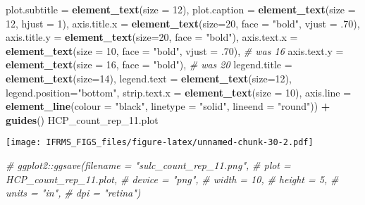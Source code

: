 \documentclass[
]{article}
\newenvironment{Shaded}{\begin{snugshade}}{\end{snugshade}}
\newcommand{\CommentTok}[1]{\textcolor[rgb]{0.56,0.35,0.01}{\textit{#1}}}
\newcommand{\DataTypeTok}[1]{\textcolor[rgb]{0.13,0.29,0.53}{#1}}
\newcommand{\DecValTok}[1]{\textcolor[rgb]{0.00,0.00,0.81}{#1}}
\newcommand{\FloatTok}[1]{\textcolor[rgb]{0.00,0.00,0.81}{#1}}
\newcommand{\KeywordTok}[1]{\textcolor[rgb]{0.13,0.29,0.53}{\textbf{#1}}}
\newcommand{\NormalTok}[1]{#1}
\newcommand{\OperatorTok}[1]{\textcolor[rgb]{0.81,0.36,0.00}{\textbf{#1}}}
\newcommand{\StringTok}[1]{\textcolor[rgb]{0.31,0.60,0.02}{#1}}
\begin{document}
\begin{Shaded}
\begin{Highlighting}[]
        \DataTypeTok{plot.subtitle =} \KeywordTok{element_text}\NormalTok{(}\DataTypeTok{size =} \DecValTok{12}\NormalTok{),}
        \DataTypeTok{plot.caption =} \KeywordTok{element_text}\NormalTok{(}\DataTypeTok{size =} \DecValTok{12}\NormalTok{, }\DataTypeTok{hjust =} \DecValTok{1}\NormalTok{),}
        \DataTypeTok{axis.title.x =} \KeywordTok{element_text}\NormalTok{(}\DataTypeTok{size=}\DecValTok{20}\NormalTok{, }\DataTypeTok{face =} \StringTok{"bold"}\NormalTok{, }\DataTypeTok{vjust =} \FloatTok{.70}\NormalTok{),}
        \DataTypeTok{axis.title.y =} \KeywordTok{element_text}\NormalTok{(}\DataTypeTok{size=}\DecValTok{20}\NormalTok{, }\DataTypeTok{face =} \StringTok{"bold"}\NormalTok{),}
        \DataTypeTok{axis.text.x =} \KeywordTok{element_text}\NormalTok{(}\DataTypeTok{size =} \DecValTok{10}\NormalTok{, }\DataTypeTok{face =} \StringTok{"bold"}\NormalTok{, }\DataTypeTok{vjust =} \FloatTok{.70}\NormalTok{), }\CommentTok{# was 16}
        \DataTypeTok{axis.text.y =} \KeywordTok{element_text}\NormalTok{(}\DataTypeTok{size =} \DecValTok{16}\NormalTok{, }\DataTypeTok{face =} \StringTok{"bold"}\NormalTok{), }\CommentTok{# was 20}
        \DataTypeTok{legend.title =} \KeywordTok{element_text}\NormalTok{(}\DataTypeTok{size=}\DecValTok{14}\NormalTok{), }
        \DataTypeTok{legend.text =} \KeywordTok{element_text}\NormalTok{(}\DataTypeTok{size=}\DecValTok{12}\NormalTok{),}
        \DataTypeTok{legend.position=}\StringTok{"bottom"}\NormalTok{, }
        \DataTypeTok{strip.text.x =} \KeywordTok{element_text}\NormalTok{(}\DataTypeTok{size =} \DecValTok{10}\NormalTok{),}
        \DataTypeTok{axis.line =} \KeywordTok{element_line}\NormalTok{(}\DataTypeTok{colour =} \StringTok{"black"}\NormalTok{, }\DataTypeTok{linetype =} \StringTok{"solid"}\NormalTok{, }\DataTypeTok{lineend =} \StringTok{"round"}\NormalTok{)) }\OperatorTok{+}\StringTok{ }
\StringTok{  }\KeywordTok{guides}\NormalTok{() }
\NormalTok{HCP_count_rep_}\FloatTok{11.}\NormalTok{plot}
\end{Highlighting}
\end{Shaded}

\texttt{[image: IFRMS\_FIGS\_files/figure-latex/unnamed-chunk-30-2.pdf]}

\begin{Shaded}
\begin{Highlighting}[]
\CommentTok{# ggplot2::ggsave(filename = "sulc_count_rep_11.png",}
\CommentTok{#                 plot = HCP_count_rep_11.plot,}
\CommentTok{#                 device = "png",}
\CommentTok{#                 width = 10,}
\CommentTok{#                 height = 5, }
\CommentTok{#                 units = "in",}
\CommentTok{#                 dpi = "retina")}
\end{Highlighting}
\end{Shaded}
\end{document}
